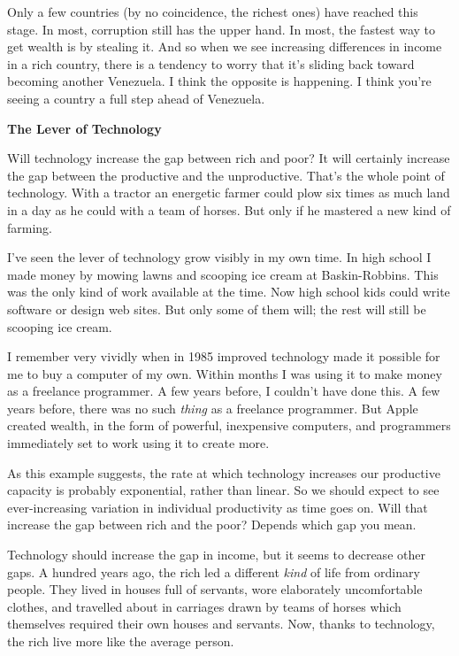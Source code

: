 Only a few countries (by no coincidence, the richest ones) have reached
this stage. In most, corruption still has the upper hand. In most, the
fastest way to get wealth is by stealing it. And so when we see
increasing differences in income in a rich country, there is a tendency
to worry that it's sliding back toward becoming another Venezuela. I
think the opposite is happening. I think you're seeing a country a full
step ahead of Venezuela.

\textbf{The Lever of Technology}

Will technology increase the gap between rich and poor? It will
certainly increase the gap between the productive and the unproductive.
That's the whole point of technology. With a tractor an energetic farmer
could plow six times as much land in a day as he could with a team of
horses. But only if he mastered a new kind of farming.

I've seen the lever of technology grow visibly in my own time. In high
school I made money by mowing lawns and scooping ice cream at
Baskin-Robbins. This was the only kind of work available at the time.
Now high school kids could write software or design web sites. But only
some of them will; the rest will still be scooping ice cream.

I remember very vividly when in 1985 improved technology made it
possible for me to buy a computer of my own. Within months I was using
it to make money as a freelance programmer. A few years before, I
couldn't have done this. A few years before, there was no such
\emph{thing} as a freelance programmer. But Apple created wealth, in the
form of powerful, inexpensive computers, and programmers immediately set
to work using it to create more.

As this example suggests, the rate at which technology increases our
productive capacity is probably exponential, rather than linear. So we
should expect to see ever-increasing variation in individual
productivity as time goes on. Will that increase the gap between rich
and the poor? Depends which gap you mean.

Technology should increase the gap in income, but it seems to decrease
other gaps. A hundred years ago, the rich led a different \emph{kind} of
life from ordinary people. They lived in houses full of servants, wore
elaborately uncomfortable clothes, and travelled about in carriages
drawn by teams of horses which themselves required their own houses and
servants. Now, thanks to technology, the rich live more like the average
person.

